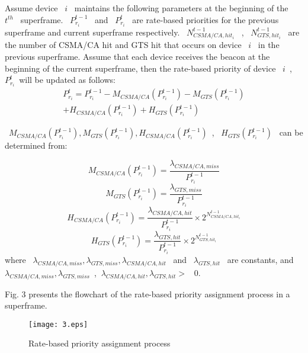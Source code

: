 \documentclass[letterpaper]{sig-alternate-10pt}
\begin{document}
Assume device ~$i$~ maintains the following parameters at the beginning of the ~$t^{th}$~ superframe. ~$P_{{r_i}}^{t - 1}$~ and ~$P_{{r_i}}^t$~ are rate-based priorities for the previous superframe and current superframe respectively. ~$N_{CSMA/CA,hi{t_i}}^{t - 1}$~ , ~$N_{GTS,hi{t_i}}^{t - 1}$~ are the number of CSMA/CA hit and GTS hit that occurs on device ~$i$~ in the previous superframe. Assume that each device receives the beacon at the beginning of the current superframe, then the rate-based priority of device ~$i$~, ~$P_{{r_i}}^t$~will be updated as follows:
\begin{equation}\begin{array}{l}
P_{{r_i}}^t = P_{{r_i}}^{t - 1} - {M_{CSMA/CA}}(P_{{r_i}}^{t - 1}) - {M_{GTS}}(P_{{r_i}}^{t - 1})\\
            + {H_{CSMA/CA}}(P_{{r_i}}^{t - 1}) + {H_{GTS}}(P_{{r_i}}^{t - 1})
\end{array}\end{equation}

~${M_{CSMA/CA}}(P_{{r_i}}^{t - 1}), {M_{GTS}}(P_{{r_i}}^{t - 1}), {H_{CSMA/CA}}(P_{{r_i}}^{t - 1})$~, ~${H_{GTS}}(P_{{r_i}}^{t - 1})$~ can be determined from:

\begin{equation}{M_{CSMA/CA}}(P_{{r_i}}^{t - 1}) = \frac{{{\lambda _{CSMA/CA,miss}}}}{{P_{{r_i}}^{t - 1}}}\end{equation}
\begin{equation}{M_{GTS}}(P_{{r_i}}^{t - 1}) = \frac{{{\lambda _{GTS,miss}}}}{{P_{{r_i}}^{t - 1}}}\end{equation}
\begin{equation}{H_{CSMA/CA}}(P_{{r_i}}^{t - 1}) = \frac{{{\lambda _{CSMA/CA,hit}}}}{{P_{{r_i}}^{t - 1}}} \times {2^{N_{CSMA/CA,hi{t_i}}^{t - 1}}}\end{equation}
\begin{equation}{H_{GTS}}(P_{{r_i}}^{t - 1}) = \frac{{{\lambda _{GTS,hit}}}}{{P_{{r_i}}^{t - 1}}} \times {2^{N_{GTS,hi{t_i}}^{t - 1}}}\end{equation}
where ~${\lambda _{CSMA/CA,miss}}, {\lambda _{GTS,miss}}, {\lambda _{CSMA/CA,hit}}$~ and ~${\lambda _{GTS,hit}}$~ are constants, and ~${\lambda _{CSMA/CA,miss}}, {\lambda _{GTS,miss}}$~, $~{\lambda _{CSMA/CA,hit}}, {\lambda _{GTS,hit}}> $~ 0.

Fig. 3 presents the flowchart of the rate-based priority assignment process in a superframe.

\begin{figure}[!t]
\renewcommand{\captionfont}{\bfseries}
\centering
\texttt{[image: 3.eps]}
\centering
\caption{Rate-based priority assignment process}
\label{fig_sim}
\end{figure}
\end{document}
